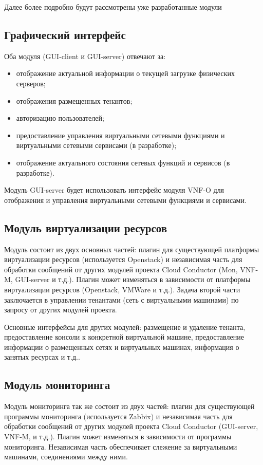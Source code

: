 \documentclass[oneside,final,14pt,a4paper]{extreport}
\begin{document}
Далее более подробно будут рассмотрены уже разработанные модули

\subsection{Графический интерфейс}
Оба модуля (GUI-client и GUI-server) отвечают за:
\begin{itemize}
	\item отображение актуальной информации о текущей загрузке физических серверов;
	\item отображения размещенных тенантов;
	\item авторизацию пользователей;
	\item предоставление управления виртуальными сетевыми функциями и виртуальными сетевыми сервисами (в разработке);
	\item отображение актуального состояния сетевых функций и сервисов (в разработке).
\end{itemize}

Модуль GUI-server будет использовать интерфейс модуля VNF-O для отображения и управления виртуальными сетевыми функциями и сервисами.

\subsection{Модуль виртуализации ресурсов}
Модуль состоит из двух основных частей: плагин для существующей платформы виртуализации ресурсов (используется Openstack) и независимая часть для обработки сообщений от других модулей проекта Cloud Conductor (Mon, VNF-M, GUI-server и т.д.). Плагин может изменяться в зависимости от платформы виртуализации ресурсов (Openstack, VMWare и т.д.). Задача второй части заключается в управлении тенантами (сеть с виртуальными машинами) по запросу от других модулей проекта. 

Основные интерфейсы для других модулей: размещение и удаление тенанта, предоставление консоли к конкретной виртуальной машине, предоставление информации о размещенных сетях и виртуальных машинах, информация о занятых ресурсах и т.д..

\subsection{Модуль мониторинга}
Модуль мониторинга так же состоит из двух частей: плагин для существующей программы мониторинга (используется Zabbix) и независимая часть для обработки сообщений от других модулей проекта Cloud Conductor (GUI-server, VNF-M, и т.д.). Плагин может изменяться в зависимости от программы мониторинга. Независимая часть обеспечивает слежение за виртуальными машинами, соединениями между ними.
\end{document}
